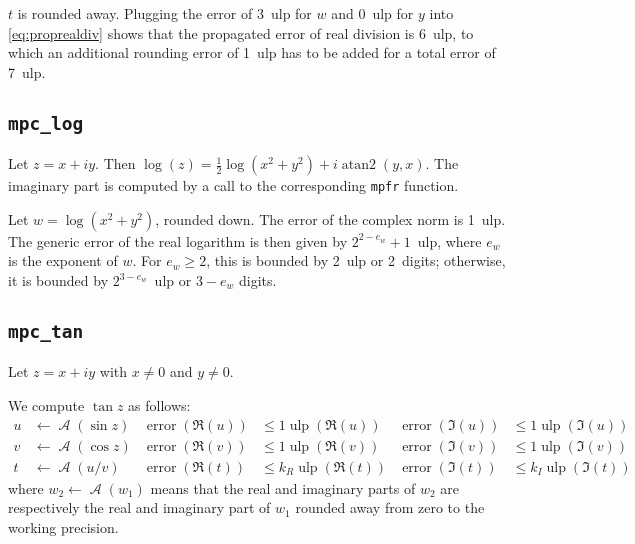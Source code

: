 \documentclass [12pt]{article}
\newcommand {\mpfr}{{\tt mpfr}}
\newcommand {\ulp}[1]{#1~ulp}
\newcommand {\Ulp}{{\operatorname {ulp}}}
\newcommand {\atantwo}{\operatorname {atan2}}
\newcommand{\error}{\operatorname {error}}
\DeclareMathOperator{\A}{\mathcal A}
\renewcommand {\leq}{\leqslant}
\renewcommand {\geq}{\geqslant}
\begin{document}
$t$ is rounded away. Plugging the error of \ulp{3} for $w$ and \ulp{0} for $y$ into
\eqref {eq:proprealdiv} shows that the propagated error of real division is
\ulp{6}, to which an additional rounding error of \ulp{1} has to be added
for a total error of \ulp{7}.


\subsection {\texttt {mpc\_log}}

Let $z = x + i y$. Then $\log (z) = \frac {1}{2} \log (x^2 + y^2) + i \atantwo (y, x)$. The imaginary part is computed by a call to the corresponding {\mpfr} function.

Let $w = \log (x^2 + y^2)$, rounded down. The error of the complex norm is \ulp{1}. The generic error of the real logarithm is then given by \ulp{$2^{2 - e_w} + 1$}, where $e_w$ is the exponent of $w$. For $e_w \geq 2$, this is bounded by \ulp{2} or 2~digits; otherwise, it is bounded by \ulp{$2^{3 - e_w}$} or $3 - e_w$ digits.

\subsection {\texttt {mpc\_tan}}

Let $z = x + i y$ with $x \neq 0$ and $y \neq 0$.

We compute $\tan z$ as follows:
\begin{align*}
u &\leftarrow \A(\sin z) &\error(\Re(u)) &\leq 1 \Ulp(\Re(u))
&\error(\Im(u)) &\leq 1 \Ulp(\Im(u))
\\
v &\leftarrow \A(\cos z) &\error(\Re(v)) &\leq 1 \Ulp(\Re(v))
&\error(\Im(v)) &\leq 1 \Ulp(\Im(v))
\\
t &\leftarrow \A(u/v) &\error(\Re(t)) &\leq k_R \Ulp(\Re(t))
&\error(\Im(t)) &\leq k_I \Ulp(\Im(t))
\end{align*}
where $w_2 \leftarrow \A(w_1)$ means that the real and imaginary parts of
$w_2$ are respectively the real and imaginary part of $w_1$ rounded away from
zero to the working precision.
\end{document}
